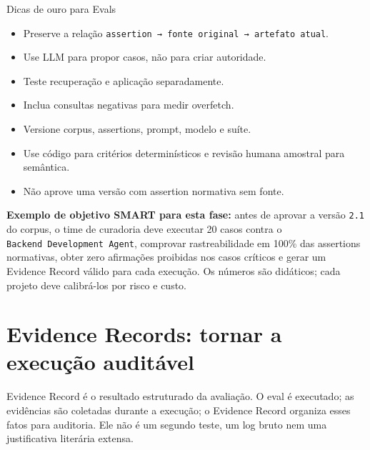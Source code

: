 \documentclass[
  10pt,
  a4paper,
  oneside]{book}
\providecommand{\tightlist}{%
  \setlength{\itemsep}{0pt}\setlength{\parskip}{0pt}}
\begin{document}
\begin{tipbox}{Dicas de ouro para Evals}

\begin{itemize}
\tightlist
\item
  Preserve a relação
  \texttt{assertion\ →\ fonte\ original\ →\ artefato\ atual}.
\item
  Use LLM para propor casos, não para criar autoridade.
\item
  Teste recuperação e aplicação separadamente.
\item
  Inclua consultas negativas para medir overfetch.
\item
  Versione corpus, assertions, prompt, modelo e suíte.
\item
  Use código para critérios determinísticos e revisão humana amostral
  para semântica.
\item
  Não aprove uma versão com assertion normativa sem fonte.
\end{itemize}

\end{tipbox}

\textbf{Exemplo de objetivo SMART para esta fase:} antes de aprovar a
versão \texttt{2.1} do corpus, o time de curadoria deve executar 20
casos contra o \texttt{Backend\ Development\ Agent}, comprovar
rastreabilidade em 100\% das assertions normativas, obter zero
afirmações proibidas nos casos críticos e gerar um Evidence Record
válido para cada execução. Os números são didáticos; cada projeto deve
calibrá-los por risco e custo.

\hypertarget{evidence-records-tornar-a-execuuxe7uxe3o-audituxe1vel}{%
\section{Evidence Records: tornar a execução
auditável}\label{evidence-records-tornar-a-execuuxe7uxe3o-audituxe1vel}}

Evidence Record é o resultado estruturado da avaliação. O eval é
executado; as evidências são coletadas durante a execução; o Evidence
Record organiza esses fatos para auditoria. Ele não é um segundo teste,
um log bruto nem uma justificativa literária extensa.
\end{document}
